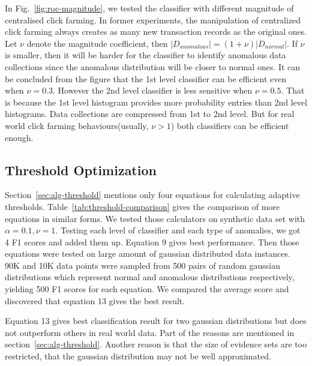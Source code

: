 \documentclass[a4paper]{IEEEtran}
\begin{document}
			In Fig.~\ref{fig:roc-magnitude}, we tested the classifier with different magnitude of centralised click farming. In former experiments, the manipulation of centralized click farming always creates as many new transaction records as the original ones. Let $\nu$ denote the magnitude coefficient, then $|D_{anomalous}| = (1 + \nu) |D_{normal}|$. If $\nu $ is smaller, then it will be harder for the classifier to identify anomalous data collections since the anomalous distribution will be closer to normal ones. It can be concluded from the figure that the 1st level classifier can be efficient even when $\nu = 0.3$. However the 2nd level classifier is less sensitive when $\nu = 0.5$. That is because the 1st level histogram provides more probability entries than 2nd level histograms. Data collections are compressed from 1st to 2nd level. But for real world click farming behaviours(usually, $\nu > 1$) both classifiers can be efficient enough.
			
		\subsection{Threshold Optimization}
			Section~\ref{sec:alg-threshold} mentions only four equations for calculating adaptive thresholds. Table~\ref{tab:threshold-comparison} gives the comparison of more equations in similar forms. We tested those calculators on synthetic data set with $\alpha = 0.1, \nu = 1$. Testing each level of classifier and each type of anomalies, we got 4 F1 scores and added them up. Equation 9 gives best performance. Then those equations were tested on large amount of gaussian distributed data instances. 90K and 10K data points were sampled from 500 pairs of random gaussian distributions which represent normal and anomalous distributions respectively, yielding 500 F1 scores for each equation. We compared the average score and discovered that equation 13 gives the best result.
			
			Equation 13 gives best classification result for two gaussian distributions but does not outperform others in real world data. Part of the reasons are mentioned in section~\ref{sec:alg-threshold}. Another reason is that the size of evidence sets are too restricted, that the gaussian distribution may not be well approximated.
			
\end{document}
